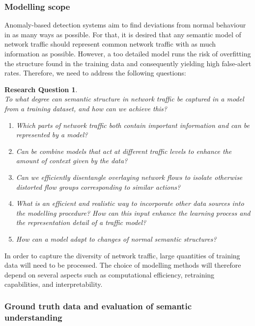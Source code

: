 \documentclass[a4paper,12pt,twoside]{report}
\newtheorem{rquestion}{Research Question}
\begin{document}
\subsubsection{Modelling scope}

Anomaly-based detection systems aim to find deviations from normal behaviour in as many ways as possible. For that, it is desired that any semantic model of network traffic should represent common network traffic with as much information as possible. However, a too detailed model runs the risk of overfitting the structure found in the training data and consequently yielding high false-alert rates. Therefore, we need to address the following questions: 

\begin{rquestion}\ \\
To what degree can semantic structure in network traffic be captured in a model from a training dataset, and how can we achieve this?
\begin{enumerate}
\item Which parts of network traffic both contain important information and can be represented by a model?
\item Can be combine models that act at different traffic levels to enhance the amount of context given by the data? 
\item Can we efficiently disentangle overlaying network flows to isolate otherwise distorted flow groups corresponding to similar actions? 
\item What is an efficient and realistic way to incorporate other data sources into the modelling procedure? How can this input enhance the learning process and the representation detail of a traffic model? 
\item How can a model adapt to changes of normal semantic structures?
\end{enumerate}
\end{rquestion}

In order to capture the diversity of network traffic, large quantities of training data will need to be processed. The choice of modelling methods will therefore depend on several aspects such as computational efficiency, retraining capabilities, and interpretability.

\subsubsection{Ground truth data and evaluation of semantic understanding}
\end{document}
